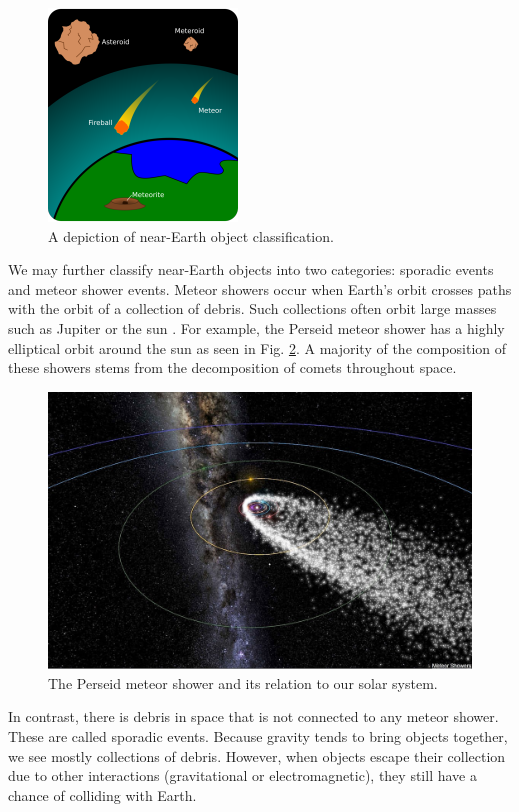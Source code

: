 \begin{figure}[ht!]
  \centering
  \includegraphics[scale=0.5]{images/jedmasterpiece.png}
  \caption{A depiction of near-Earth object classification.}
  \label{jed}
\end{figure}

We may further classify near-Earth objects into two categories: sporadic events and meteor shower events. 
Meteor showers occur when Earth's orbit crosses paths with the orbit of a collection of debris. 
Such collections often orbit large masses such as Jupiter or the sun \cite{trigo-rodriguez_2006_2007}.  
For example, the Perseid meteor shower has a highly elliptical orbit around the sun as seen in Fig. \ref{perceid}.  
A majority of the composition of these showers stems from the decomposition of comets throughout space.  

\begin{figure}[ht!]
  \centering
  \includegraphics[scale=0.7]{images/persiod_shower.jpg}
  \caption{The Perseid meteor shower and its relation to our solar system.}
  \label{perceid}
\end{figure}

In contrast, there is debris in space that is not connected to any meteor shower. 
These are called sporadic events. 
Because gravity tends to bring objects together, we see mostly collections of debris.
However, when objects escape their collection due to other interactions (gravitational or electromagnetic), they still have a chance of colliding with Earth.

